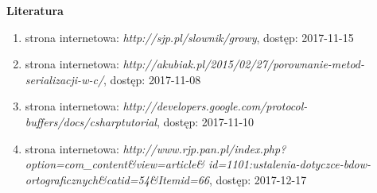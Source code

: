 \pagestyle {empty}

\vspace*{1.3cm}

{\Huge\textbf{Literatura}}

\vspace*{1cm}

\begin{enumerate}[\lbrack 1\rbrack]
	\item strona internetowa: \textit{http://sjp.pl/slownik/growy}, dostęp: 2017-11-15 \label{bib:slownik}
	\item strona internetowa: \textit{http://akubiak.pl/2015/02/27/porownanie-metod-serializacji-w-c/}, dostęp: 2017-11-08 \label{bib:serializ}
	\item strona internetowa: \textit{http://developers.google.com/protocol-buffers/docs/csharptutorial}, dostęp: 2017-11-10 \label{bib:protbuf}
	\item strona internetowa: \textit{http://www.rjp.pan.pl/index.php?option=com\_content\&view=article\&
		id=1101:ustalenia-dotyczce-bdow-ortograficznych\&catid=54\&Itemid=66}, dostęp: 2017-12-17 \label{bib:ort}
\end{enumerate}


